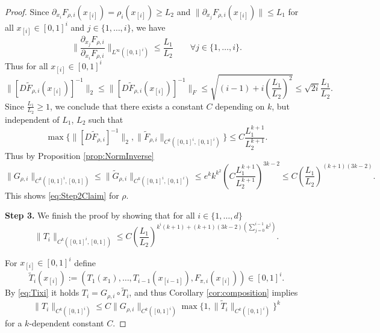 \begin{proof}
  Since
  $\partial_{x_i}F_{\rho, i}(x_{[i]}) = \rho_i(x_{[i]}) \geq L_2$ and
  $\|\partial_{x_j}F_{\rho, i}(x_{[i]})\| \leq L_1$ for all
  $x_{[i]}\in [0,1]^i$ and $j\in\{1,\dots,i\}$, we have
  \begin{equation*}
    \Big\|\frac{\partial_{x_j}F_{\rho, i}}{\partial_{x_i}F_{\rho,
        i}}\Big\|_{L^\infty([0,1]^i)} \leq \frac{L_1}{L_2}
    \qquad
    \forall j\in\{1,\dots,i\}.
  \end{equation*}
  Thus for all $x_{[i]}\in [0,1]^i$
  \begin{equation*}
    \|[D\tilde{F}_{\rho, i}(x_{[i]})]^{-1}\|_2 \le \|[D\tilde{F}_{\rho,
      i}(x_{[i]})]^{-1}\|_F \le
    \sqrt{(i-1) + i(\frac{L_1}{L_2})^2} \le
    \sqrt{2i}\frac{L_1}{L_2}.
  \end{equation*}
  Since $\frac{L_1}{L_2} \ge 1$, we conclude that there exists a
  constant $C$ depending on $k$, but independent of $L_1$, $L_2$ such
  that
  \begin{equation*}
    \max\{\|[D\tilde{F}_{\rho, i}]^{-1}\|_2, \|\tilde{F}_{\rho,
      i}\|_{C^k([0,1]^i, [0,1]^i)}\} \leq
    C\frac{L_1^{k+1}}{L_2^{k+1}}.
  \end{equation*}
  Thus by Proposition \ref{prop:NormInverse}
  \begin{equation*}
    \|G_{\rho, i}\|_{C^k([0,1]^i, [0,1])}\leq \|\tilde{G}_{\rho,
      i}\|_{C^k([0,1]^i, [0,1]^i)} \leq
    e^kk^{k^2}\left(C\frac{L_1^{k+1}}{L_2^{k+1}}\right)^{3k-2} \leq C
    \left(\frac{L_1}{L_2}\right)^{(k+1)(3k-2)}.
  \end{equation*}
  This shows \eqref{eq:Step2Claim} for $\rho$.
  
  {\bf Step 3.} We finish the proof by showing that for all
  $i\in\{1,\dots,d\}$
  \begin{equation}\label{eq:Step3Claim}
    \|T_i\|_{C^k([0,1]^i, [0,1])} \leq C\left(\frac{L_1}{L_2}\right)^{k^i(k+1)+(k+1)(3k-2)(\sum_{j=0}^{i-1}k^j)}.
  \end{equation}

  For $x_{[i]}\in [0,1]^i$ define
  \begin{equation}\label{eq:tildeTidef}
    \tilde{T}_i(x_{[i]}) := (T_1(x_1), \dots,
    T_{i-1}(x_{[i-1]}), F_{\pi, i}(x_{[i]}))\in [0,1]^i.
  \end{equation}
  By \eqref{eq:Tixi} it holds $T_i=G_{\rho,i}\circ\tilde T_i$, and
  thus Corollary \ref{cor:composition} implies
  \begin{equation}\label{eq:Step3main}
    \|T_i\|_{C^k([0,1]^i)}\le C\|G_{\rho,i}\|_{C^k([0,1]^i)}\max\{1,\|\tilde T_i\|_{C^k([0,1]^i)}\}^k
  \end{equation}
  for a $k$-dependent constant $C$.



\end{proof}
